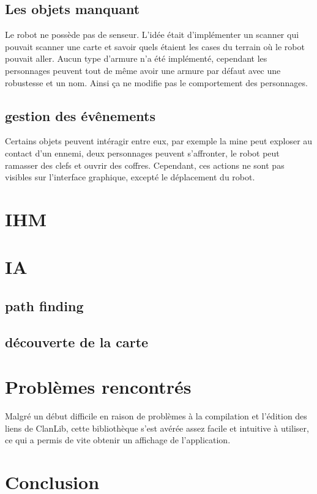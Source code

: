 \documentclass[a4paper 12pts]{article}
\begin{document}
\subsection{Les objets manquant}
Le robot ne possède pas de senseur. L'idée était d'implémenter un scanner qui pouvait scanner une carte et savoir quels étaient les cases du terrain où le robot pouvait aller. Aucun type d'armure n'a été implémenté, cependant les personnages peuvent tout de même avoir une armure par défaut avec une robustesse et un nom. Ainsi ça ne modifie pas le comportement des personnages.

\subsection{gestion des évênements}
Certains objets peuvent intéragir entre eux, par exemple la mine peut exploser au contact d'un ennemi, deux personnages peuvent s'affronter, le robot peut ramasser des clefs et ouvrir des coffres. Cependant, ces actions ne sont pas visibles sur l'interface graphique, excepté le déplacement du robot.



\section{IHM}



\section{IA}


\subsection{path finding}
\subsection{découverte de la carte}



\section{Problèmes rencontrés}

Malgré un début difficile en raison de problèmes à la compilation et l'édition des liens de ClanLib, cette bibliothèque s'est avérée assez facile et intuitive à utiliser, ce qui a permis de vite obtenir un affichage de l'application.

\section{Conclusion}
\end{document}
